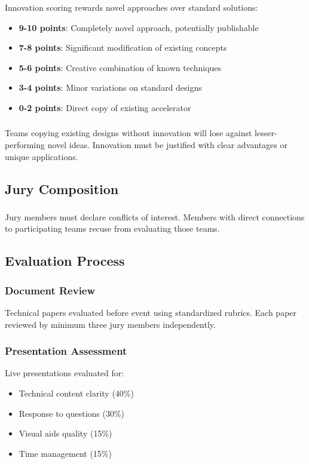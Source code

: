 \subsubsection{}
Innovation scoring rewards novel approaches over standard solutions:

\begin{itemize}[noitemsep]
    \item \textbf{9-10 points}: Completely novel approach, potentially publishable
    \item \textbf{7-8 points}: Significant modification of existing concepts
    \item \textbf{5-6 points}: Creative combination of known techniques
    \item \textbf{3-4 points}: Minor variations on standard designs
    \item \textbf{0-2 points}: Direct copy of existing accelerator
\end{itemize}

\subsubsection{}
Teams copying existing designs without innovation will lose against lesser-performing novel ideas. Innovation must be justified with clear advantages or unique applications.

\subsection{Jury Composition}

\subsubsection{}
Jury members must declare conflicts of interest. Members with direct connections to participating teams recuse from evaluating those teams.

\subsection{Evaluation Process}

\subsubsection{Document Review}
Technical papers evaluated before event using standardized rubrics. Each paper reviewed by minimum three jury members independently.

\subsubsection{Presentation Assessment}
Live presentations evaluated for:
\begin{itemize}[noitemsep]
    \item Technical content clarity (40\%)
    \item Response to questions (30\%)
    \item Visual aids quality (15\%)
    \item Time management (15\%)
\end{itemize}

